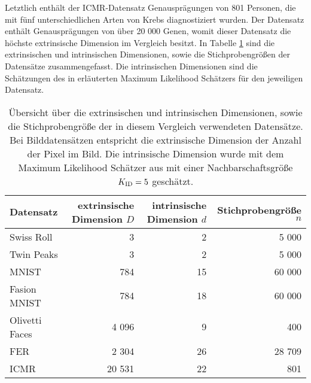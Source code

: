 
Letztlich enthält der ICMR-Datensatz Genausprägungen von 801 Personen, die mit fünf
unterschiedlichen Arten von Krebs diagnostiziert wurden. Der Datensatz enthält Genausprägungen von
über 20 000 Genen, womit dieser Datensatz die höchste extrinsische Dimension im Vergleich besitzt.
In Tabelle \ref{tab:uebersicht-datensaetze} sind die extrinsischen und intrinsischen Dimensionen,
sowie die Stichprobengrößen der Datensätze zusammengefasst. Die intrinsischen Dimensionen sind die
Schätzungen des in 
erläuterten Maximum Likelihood Schätzers für den jeweiligen Datensatz.

\begin{table}[]
	\centering
	\begin{tabular}{@{}lrrr@{}}
		\toprule
		Datensatz      & extrinsische Dimension $D$ & intrinsische Dimension $d$ & Stichprobengröße $n$ \\ \midrule
		Swiss Roll     & 3                          & 2                          & 5 000                \\
		Twin Peaks     & 3                          & 2                          & 5 000                \\
		MNIST          & 784                        & 15                         & 60 000               \\
		Fasion MNIST   & 784                        & 18                         & 60 000               \\
		Olivetti Faces & 4 096                      & 9                          & 400                  \\
		FER            & 2 304                      & 26                         & 28 709               \\
		ICMR           & 20 531                     & 22                         & 801                  \\
		\bottomrule
	\end{tabular}
	\caption[Übersicht über die extrinsischen und intrinsischen Dimensionen, sowie die Stichprobengröße der in diesem Vergleich verwendeten Datensätze]{Übersicht über die extrinsischen und intrinsischen Dimensionen, sowie die Stichprobengröße der in diesem Vergleich verwendeten Datensätze. Bei Bilddatensätzen entspricht die extrinsische Dimension der Anzahl der Pixel im Bild. Die intrinsische Dimension wurde mit dem Maximum Likelihood Schätzer aus  mit einer Nachbarschaftsgröße $K_{\text{ID}} = 5$ geschätzt.}
	\label{tab:uebersicht-datensaetze}
\end{table}

